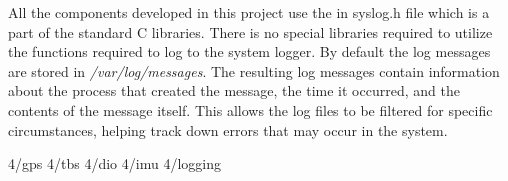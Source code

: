 All the components developed in this project use the in syslog.h file which is a part of the standard C libraries. There is no special libraries required to utilize the functions required to log to the system logger. By default the log messages are stored in \emph{/var/log/messages}. The resulting log messages contain information about the process that created the message, the time it occurred, and the contents of the message itself. This allows the log files to be filtered for specific circumstances, helping track down errors that may occur in the system.


 {4/gps}
 {4/tbs}
 {4/dio}
 {4/imu}
 {4/logging}




